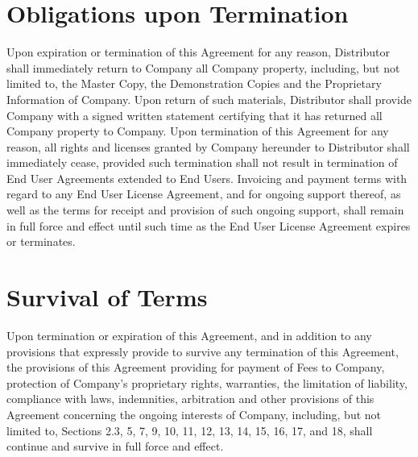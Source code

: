 \documentclass[letterpaper,10pt,english]{sphinxmanual}
\begin{document}
\section{Obligations upon Termination}
\label{\detokenize{terminiation:obligations-upon-termination}}
Upon expiration or termination of this Agreement for any reason, Distributor shall immediately return to Company all Company property, including, but not limited to, the Master Copy, the Demonstration Copies and the Proprietary Information of Company. Upon return of such materials, Distributor shall provide Company with a signed written statement certifying that it has returned all Company property to Company. Upon termination of this Agreement for any reason, all rights and licenses granted by Company hereunder to Distributor shall immediately cease, provided such termination shall not result in termination of End User Agreements extended to End Users. Invoicing and payment terms with regard to any End User License Agreement, and for ongoing support thereof, as well as the terms for receipt and provision of such ongoing support, shall remain in full force and effect until such time as the End User License Agreement expires or terminates.


\section{Survival of Terms}
\label{\detokenize{terminiation:survival-of-terms}}
Upon termination or expiration of this Agreement, and in addition to any provisions that expressly provide to survive any termination of this Agreement, the provisions of this Agreement providing for payment of Fees to Company, protection of Company’s proprietary rights, warranties, the limitation of liability, compliance with laws, indemnities, arbitration and other provisions of this Agreement concerning the ongoing interests of Company, including, but not limited to, Sections 2.3, 5, 7, 9, 10, 11, 12, 13, 14, 15, 16, 17, and 18, shall continue and survive in full force and effect.
\end{document}
